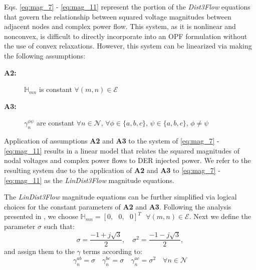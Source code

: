 Eqs. \eqref{eq:mag_7} - \eqref{eq:mag_11} represent the portion of the \emph{Dist3Flow} equations that govern the relationship between squared voltage magnitudes between adjacent nodes and complex power flow.  This system, as it is nonlinear and nonconvex, is difficult to directly incorporate into an OPF formulation without the use of convex relaxations.  However, this system can be linearized via making the following assumptions:

\begin{description}
	\item[\textbf{A2:} ] $\mathbb{H}_{mn}$ is constant $\forall (m,n) \in \mathcal{E}$
	\item[\textbf{A3:} ] $\gamma_{n}^{\phi \psi}$ are constant $\forall n \in \mathcal{N}$, $\forall \phi \in \{a,b,c\}$, $\psi \in \{a,b,c\}$,  $\phi \ne \psi$    
\end{description}

\noindent Application of assumptions \textbf{A2} and \textbf{A3} to the system of \eqref{eq:mag_7} - \eqref{eq:mag_11} results in a linear model that relates the squared magnitudes of nodal voltages and complex power flows to DER injected power.  We refer to the resulting system due to the application of \textbf{A2} and \textbf{A3} to \eqref{eq:mag_7} - \eqref{eq:mag_11} as the \emph{LinDist3Flow} magnitude equations.

The \emph{LinDist3Flow} magnitude equations can be further simplified via logical choices for the constant parameters of \textbf{A2} and \textbf{A3}.  Following the analysis presented in \cite{baran1989optimal}, we choose $\mathbb{H}_{mn} = {\left[0, \text{ } 0, \text{ } 0 \right]}^{T} \text{ } \forall (m,n) \in \mathcal{E}$.  Next we define the parameter $\sigma$ such that:
\begin{equation}
	\sigma = \frac{-1 + j\sqrt{3}}{2}, \quad \sigma^{2} = \frac{-1 - j\sqrt{3}}{2}
    \label{eq:sigma},
\end{equation}
\noindent and assign them to the $\gamma$ terms according to:
\begin{equation}
	\gamma_{n}^{ab} = \sigma \quad \gamma_{n}^{bc} = \sigma \quad \gamma_{n}^{ac} = \sigma^{2} \quad \forall n \in \mathcal{N}
    \label{eq:gamma}
\end{equation}

